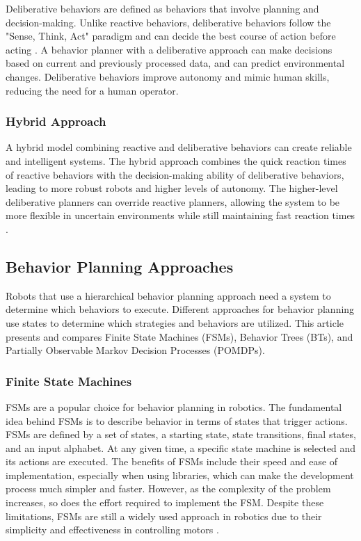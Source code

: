 \documentclass[letterpaper, 10pt, conference]{ieeeconf}
\begin{document}
Deliberative behaviors are defined as behaviors that involve planning and decision-making. Unlike reactive behaviors, deliberative behaviors follow the "Sense, Think, Act" paradigm and can decide the best course of action before acting \cite{murphy2000}. A behavior planner with a deliberative approach can make decisions based on current and previously processed data, and can predict environmental changes. Deliberative behaviors improve autonomy and mimic human skills, reducing the need for a human operator.

\subsubsection{Hybrid Approach}

A hybrid model combining reactive and deliberative behaviors can create reliable and intelligent systems. The hybrid approach combines the quick reaction times of reactive behaviors with the decision-making ability of deliberative behaviors, leading to more robust robots and higher levels of autonomy. The higher-level deliberative planners can override reactive planners, allowing the system to be more flexible in uncertain environments while still maintaining fast reaction times \cite{arkin1998}.

\subsection{Behavior Planning Approaches}

Robots that use a hierarchical behavior planning approach need a system to determine which behaviors to execute. Different approaches for behavior planning use states to determine which strategies and behaviors are utilized. This article presents and compares Finite State Machines (FSMs), Behavior Trees (BTs), and Partially Observable Markov Decision Processes (POMDPs).

\subsubsection{Finite State Machines}

FSMs are a popular choice for behavior planning in robotics. The fundamental idea behind FSMs is to describe behavior in terms of states that trigger actions. FSMs are defined by a set of states, a starting state, state transitions, final states, and an input alphabet. At any given time, a specific state machine is selected and its actions are executed. The benefits of FSMs include their speed and ease of implementation, especially when using libraries, which can make the development process much simpler and faster. However, as the complexity of the problem increases, so does the effort required to implement the FSM. Despite these limitations, FSMs are still a widely used approach in robotics due to their simplicity and effectiveness in controlling motors \cite{wagner2006}.
\end{document}
